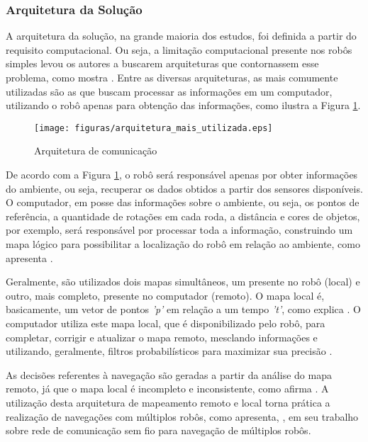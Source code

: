 		\subsubsection{Arquitetura da Solução}
		\label{sub:arquitetura_solucao}

			A arquitetura da solução, na grande maioria dos estudos, foi definida a partir do requisito computacional. Ou seja, a limitação computacional presente nos robôs simples levou os autores a buscarem arquiteturas que contornassem esse problema, como mostra \cite{redeComunicacaoIndustria}. Entre as diversas arquiteturas, as mais comumente utilizadas são as que buscam processar as informações em um computador, utilizando o robô apenas para obtenção das informações, como ilustra a Figura \ref{img:arquitetura_mais_utilizada}.

			\begin{figure}[H]
				\centering
				\texttt{[image: figuras/arquitetura\_mais\_utilizada.eps]}
				\caption[Arquitetura de Comunicação]{Arquitetura de comunicação}
				\label{img:arquitetura_mais_utilizada}
			\end{figure}

			De acordo com a Figura \ref{img:arquitetura_mais_utilizada}, o robô será responsável apenas por obter informações do ambiente, ou seja, recuperar os dados obtidos a partir dos sensores disponíveis. O computador, em posse das informações sobre o ambiente, ou seja, os pontos de referência, a quantidade de rotações em cada roda, a distância e cores de objetos, por exemplo, será responsável por processar toda a informação, construindo um mapa lógico para possibilitar a localização do robô em relação ao ambiente, como apresenta \cite{redeComunicacaoIndustria}.

			Geralmente, são utilizados dois mapas simultâneos, um presente no robô (local) e outro, mais completo, presente no computador (remoto). O mapa local é, basicamente, um vetor de pontos \textit{'p'} em relação a um tempo \textit{'t'}, como explica \cite{circumventingAssociationSLAM}. O computador utiliza este mapa local, que é disponibilizado pelo robô, para completar, corrigir e atualizar o mapa remoto, mesclando informações e utilizando, geralmente, filtros probabilísticos para maximizar sua precisão \cite{localizacaoEMapeamentoPaulo}.

			As decisões referentes à navegação são geradas a partir da análise do mapa remoto, já que o mapa local é incompleto e inconsistente, como afirma \cite{redeComunicacaoIndustria}. A utilização desta arquitetura de mapeamento remoto e local torna prática a realização de navegações com múltiplos robôs, como apresenta, \cite{redeComunicacaoIndustria}, em seu trabalho sobre rede de comunicação sem fio para navegação de múltiplos robôs.

